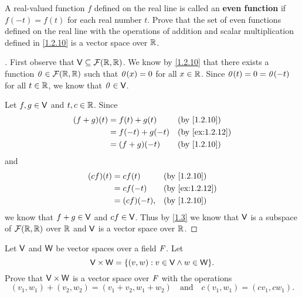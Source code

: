 \begin{ex}\label{ex:1.2.12}
	A real-valued function \(f\) defined on the real line is called an \textbf{even function} if \(f(-t) = f(t)\) for each real number \(t\).
	Prove that the set of even functions defined on the real line with the operations of addition and scalar multiplication defined in \cref{1.2.10} is a vector space over \(\mathbb{R}\).
\end{ex}

\begin{proof}[]
	First observe that \(\mathsf{V} \subseteq \mathcal{F}(\mathbb{R}, \mathbb{R})\).
	We know by \cref{1.2.10} that there exists a function \(\mathit{0} \in \mathcal{F}(\mathbb{R}, \mathbb{R})\) such that \(\mathit{0}(x) = 0\) for all \(x \in \mathbb{R}\).
	Since \(\mathit{0}(t) = 0 = \mathit{0}(-t)\) for all \(t \in \mathbb{R}\), we know that \(\mathit{0} \in \mathsf{V}\).

	Let \(f, g \in \mathsf{V}\) and \(t, c \in \mathbb{R}\).
	Since
	\begin{align*}
		(f + g)(t) & = f(t) + g(t)   &  & \text{(by \cref{1.2.10})}    \\
		           & = f(-t) + g(-t) &  & \text{(by \cref{ex:1.2.12})} \\
		           & = (f + g)(-t)   &  & \text{(by \cref{1.2.10})}
	\end{align*}
	and
	\begin{align*}
		(cf)(t) & = cf(t)     &  & \text{(by \cref{1.2.10})}    \\
		        & = cf(-t)    &  & \text{(by \cref{ex:1.2.12})} \\
		        & = (cf)(-t), &  & \text{(by \cref{1.2.10})}
	\end{align*}
	we know that \(f + g \in \mathsf{V}\) and \(cf \in \mathsf{V}\).
	Thus by \cref{1.3} we know that \(\mathsf{V}\) is a subspace of \(\mathcal{F}(\mathbb{R}, \mathbb{R})\) over \(\mathbb{R}\) and \(\mathsf{V}\) is a vector space over \(\mathbb{R}\).
\end{proof}

\setcounter{ex}{20}
\begin{ex}\label{ex:1.2.21}
	Let \(\mathsf{V}\) and \(\mathsf{W}\) be vector spaces over a field \(\mathit{F}\).
	Let
	\[
		\V \times \W = \set{(v, w) : v \in \V \land w \in \W}.
	\]
	Prove that \(\mathsf{V} \times \mathsf{W}\) is a vector space over \(\mathit{F}\) with the operations
	\[
		(v_1, w_1) + (v_2, w_2) = (v_1 + v_2, w_1 + w_2) \quad \text{and} \quad c(v_1, w_1) = (cv_1, cw_1).
	\]
\end{ex}

